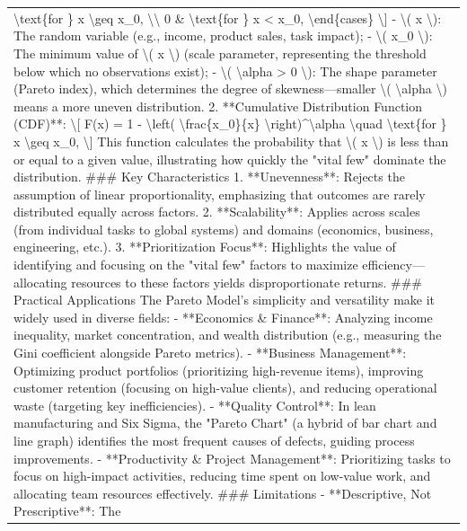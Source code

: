 \begin{longtable}[]{@{}l@{}}
\textbackslash text\{for \} x \textbackslash geq x\_0,
\textbackslash\textbackslash{} 0 \& \textbackslash text\{for \} x
\textless{} x\_0, \textbackslash end\{cases\} \textbackslash{]} -
\textbackslash( x \textbackslash): The random variable (e.g., income,
product sales, task impact); - \textbackslash( x\_0 \textbackslash): The
minimum value of \textbackslash( x \textbackslash) (scale parameter,
representing the threshold below which no observations exist); -
\textbackslash( \textbackslash alpha \textgreater{} 0 \textbackslash):
The shape parameter (Pareto index), which determines the degree of
skewness---smaller \textbackslash( \textbackslash alpha \textbackslash)
means a more uneven distribution. 2. **Cumulative Distribution Function
(CDF)**: \textbackslash{[} F(x) = 1 - \textbackslash left(
\textbackslash frac\{x\_0\}\{x\}
\textbackslash right)\^{}\textbackslash alpha \textbackslash quad
\textbackslash text\{for \} x \textbackslash geq x\_0, \textbackslash{]}
This function calculates the probability that \textbackslash( x
\textbackslash) is less than or equal to a given value, illustrating how
quickly the "vital few" dominate the distribution. \#\#\# Key
Characteristics 1. **Unevenness**: Rejects the assumption of linear
proportionality, emphasizing that outcomes are rarely distributed
equally across factors. 2. **Scalability**: Applies across scales (from
individual tasks to global systems) and domains (economics, business,
engineering, etc.). 3. **Prioritization Focus**: Highlights the value of
identifying and focusing on the "vital few" factors to maximize
efficiency---allocating resources to these factors yields
disproportionate returns. \#\#\# Practical Applications The Pareto
Model's simplicity and versatility make it widely used in diverse
fields: - **Economics \& Finance**: Analyzing income inequality, market
concentration, and wealth distribution (e.g., measuring the Gini
coefficient alongside Pareto metrics). - **Business Management**:
Optimizing product portfolios (prioritizing high-revenue items),
improving customer retention (focusing on high-value clients), and
reducing operational waste (targeting key inefficiencies). - **Quality
Control**: In lean manufacturing and Six Sigma, the "Pareto Chart" (a
hybrid of bar chart and line graph) identifies the most frequent causes
of defects, guiding process improvements. - **Productivity \& Project
Management**: Prioritizing tasks to focus on high-impact activities,
reducing time spent on low-value work, and allocating team resources
effectively. \#\#\# Limitations - **Descriptive, Not Prescriptive**: The

\end{longtable}
